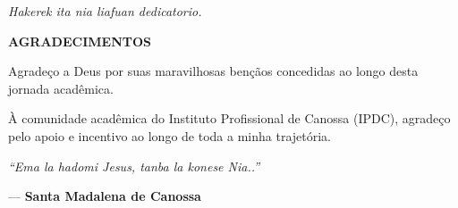 \begin{titlepage} %
   \vspace*{\fill}
   \centering
   \noindent
   \textit{ Hakerek ita nia liafuan dedicatorio. 
   } \vspace*{\fill}
\end{titlepage}

\begin{titlepage} %
\centering
\textbf{\large AGRADECIMENTOS}
\vspace{1cm}


\justifying

Agradeço a Deus por suas maravilhosas bençãos concedidas ao longo desta jornada acadêmica.

À comunidade acadêmica do Instituto Profissional de Canossa (IPDC), agradeço pelo apoio e incentivo ao longo de toda a minha trajetória.

\end{titlepage}


\cleardoublepage
\thispagestyle{empty}

\vspace*{\fill}

\begin{flushright}
\begin{minipage}{0.7\textwidth}
\raggedleft
\textit{
``Ema la hadomi Jesus, tanba la konese Nia..''
}

\medskip
--- \textbf{Santa Madalena de Canossa}
\end{minipage}
\end{flushright}


